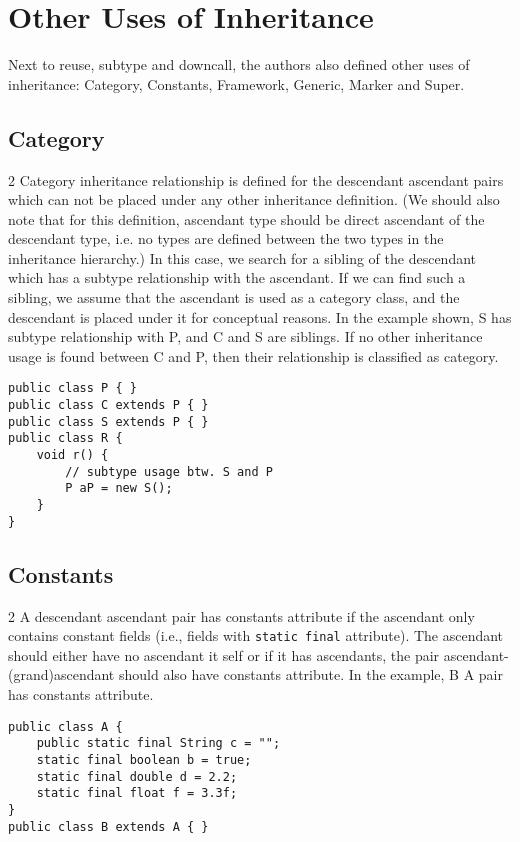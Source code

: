 \documentclass{uvamscse}
\begin{document}
\section{Other Uses of Inheritance}
Next to reuse, subtype and downcall, the authors also defined other uses of inheritance: Category, Constants, Framework, Generic, Marker and Super.

\subsection{Category}
\begin{multicols} {2}
Category inheritance relationship is defined for the descendant ascendant pairs which can not be placed under any other inheritance definition. (We should also note that for this definition, ascendant type should be direct ascendant of the descendant type, i.e. no types are defined between the two types in the inheritance hierarchy.) In this case, we search for a sibling of the descendant which has a subtype relationship with the ascendant. If we can find such a sibling, we assume that the ascendant is used as a category class, and the descendant is placed under it for conceptual reasons. In the example shown, S has subtype relationship with P, and C and S are siblings. If no other inheritance usage is found between C and P, then their relationship is classified as category. 
\columnbreak
\begin{verbatim}
public class P { }
public class C extends P { }
public class S extends P { }
public class R {
    void r() {
    	// subtype usage btw. S and P
        P aP = new S();  
    }          
}
\end{verbatim}
\end{multicols}
       
\subsection{Constants}
\begin{multicols} {2}
A descendant ascendant pair has constants attribute if the ascendant only contains constant fields (i.e., fields with \texttt{static final} attribute). The ascendant should either have no ascendant it self or if it has ascendants, the pair ascendant-(grand)ascendant should also have constants attribute. In the example, B A pair has constants attribute.
\columnbreak
\begin{verbatim}
public class A {
    public static final String c = ""; 
    static final boolean b = true;		
    static final double d = 2.2;		
    static final float f = 3.3f;		
}
public class B extends A { }
\end{verbatim}
\end{multicols}
\end{document}
